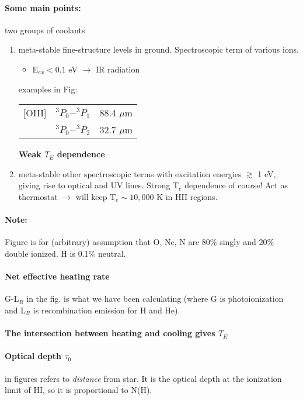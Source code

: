 \documentclass[12pt]{article}
\begin{document}
\paragraph{Some main points:} two groups of coolants
\begin{enumerate}
    \item meta-stable fine-structure levels in ground.
        Spectroscopic term of various ions.
        \begin{itemize}
            \item E$_{ex} < 0.1$ eV $\rightarrow$ IR radiation
        \end{itemize}
        examples in Fig:
        \begin{center}
            \begin{tabular}{c c c}
                [OIII] & $^{3}P_{0} - ^{3}P_{1}$ & 88.4 $\mu$m\\
                       & $^{3}P_{0} - ^{3}P_{2}$ & 32.7 $\mu$m\\
            \end{tabular}
        \end{center}
        \textbf{Weak $T_{E}$ dependence}
    \item meta-stable other spectroscopic terms with excitation energies
        $\gtrsim$ 1 eV, giving rise to optical and UV lines.
        Strong T$_{e}$ dependence of course! Act as thermostat
        $\rightarrow$ will keep T$_{e} \sim 10,000$ K in HII regions.
\end{enumerate}

\paragraph{Note:}
Figure is for (arbitrary) assumption that O, Ne, N are 80\% singly and
20\% double ionized. H is 0.1\% neutral.
\paragraph{Net effective heating rate}
G-L$_{R}$ in the fig. is what we have been calculating
(where G is photoionization and L$_{R}$ is recombination emission for
H and He).

\paragraph{The intersection between heating and cooling gives $T_{E}$}

\paragraph{Optical depth $\tau_{0}$} in figures refers to \emph{distance}
from star. It is the optical depth at the ionization limit of HI, so
it is proportional to N(H).
\end{document}
